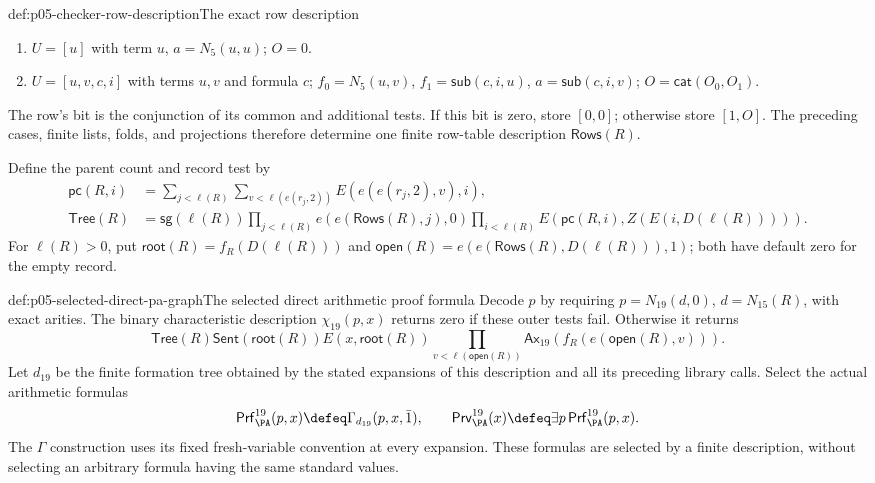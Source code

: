 \begin{hbdefinition}{def:p05-checker-row-description}{The exact row description}
\begin{enumerate}
\item[18.] \(U=[u]\) with term \(u\), \(a=N_5(u,u)\); \(O=0\).
\item[19.] \(U=[u,v,c,i]\) with terms \(u,v\) and formula \(c\);
 \(f_0=N_5(u,v)\), \(f_1=\mathsf{sub}(c,i,u)\),
 \(a=\mathsf{sub}(c,i,v)\); \(O=\mathsf{cat}(O_0,O_1)\).
\end{enumerate}
The row's bit is the conjunction of its common and additional tests.  If
this bit is zero, store \([0,0]\); otherwise store \([1,O]\).
The preceding cases, finite lists, folds, and projections therefore determine
one finite row-table description \(\mathsf{Rows}(R)\).

Define the parent count and record test by
\[
\begin{aligned}
 \mathsf{pc}(R,i)&=\sum_{j<\ell(R)}
                    \sum_{v<\ell(e(r_j,2))}E(e(e(r_j,2),v),i),\\
 \mathsf{Tree}(R)&=\mathsf{sg}(\ell(R))
       \prod_{j<\ell(R)}e(e(\mathsf{Rows}(R),j),0)
       \prod_{i<\ell(R)}E(\mathsf{pc}(R,i),Z(E(i,D(\ell(R))))).
\end{aligned}
\]
For \(\ell(R)>0\), put
\(\mathsf{root}(R)=f_R(D(\ell(R)))\) and
\(\mathsf{open}(R)=e(e(\mathsf{Rows}(R),D(\ell(R))),1)\);
both have default zero for the empty record.
\end{hbdefinition}

\begin{hbdefinition}{def:p05-selected-direct-pa-graph}{The selected direct arithmetic proof formula}
Decode \(p\) by requiring \(p=N_{19}(d,0)\), \(d=N_{15}(R)\),
with exact arities.  The binary characteristic description \(\chi_{19}(p,x)\)
returns zero if these outer tests fail.  Otherwise it returns
\[
 \mathsf{Tree}(R)\mathsf{Sent}(\mathsf{root}(R))E(x,\mathsf{root}(R))
     \prod_{v<\ell(\mathsf{open}(R))}
       \mathsf{Ax}_{19}(f_R(e(\mathsf{open}(R),v))).
\]
Let \(d_{19}\) be the finite formation tree obtained by the stated
expansions of this description and all its preceding library calls.  Select
the actual arithmetic formulas
\[
 \mathsf{Prf}^{19}_{\PA}(p,x)\defeq\Gamma_{d_{19}}(p,x,\bar1),
 \qquad
 \mathsf{Prv}^{19}_{\PA}(x)\defeq
                   \exists p\,\mathsf{Prf}^{19}_{\PA}(p,x).
\]
The \(\Gamma\) construction uses its fixed fresh-variable convention at
every expansion.  These formulas are selected by a finite description,
without selecting an arbitrary formula having the same standard values.
\end{hbdefinition}

